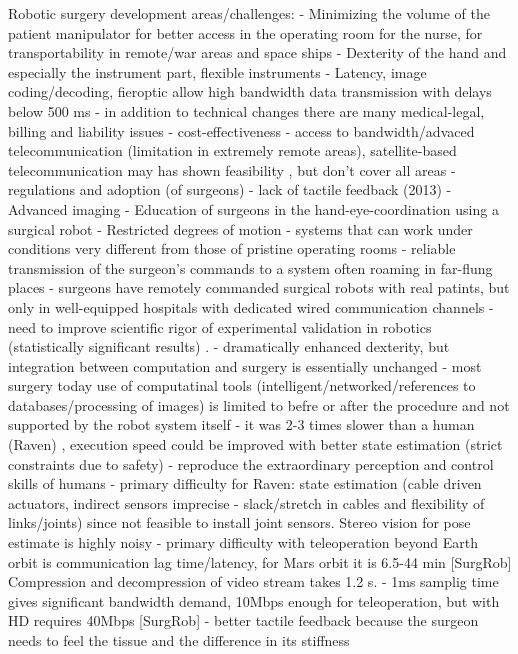 Robotic surgery development areas/challenges:
- Minimizing the volume of the patient manipulator for better access in the operating room for the nurse, for transportability in remote/war areas and space ships
- Dexterity of the hand and especially the instrument part, flexible instruments
- Latency, image coding/decoding, fieroptic allow high bandwidth data transmission with delays below 500 ms
- in addition to technical changes there are many medical-legal, billing and liability issues
- cost-effectiveness
- access to bandwidth/advaced telecommunication (limitation in extremely remote areas), satellite-based telecommunication may has shown feasibility \citep{bib:telesurg_history}, but don't cover all areas \citep{bib:docatadist}
- regulations and adoption (of surgeons)
- lack of tactile feedback (2013)
- Advanced imaging
- Education of surgeons in the hand-eye-coordination using a surgical robot
- Restricted degrees of motion
- systems that can work under conditions very different from those of pristine operating rooms \citep{bib:docatadist}
- reliable transmission of the surgeon's commands to a system often roaming in far-flung places
- surgeons have remotely commanded surgical robots with real patints, but only in well-equipped hospitals with dedicated wired communication channels
- need to improve scientific rigor of experimental validation in robotics (statistically significant results) \citep{bib:raven_ii}.
- dramatically enhanced dexterity, but integration between computation and surgery is essentially unchanged \citep{bib:raven_ii}
- most surgery today use of computatinal tools (intelligent/networked/references to databases/processing of images) is limited to befre or after the procedure and not supported by the robot system itself \citep{bib:raven_ii}
- it was 2-3 times slower than a human (Raven) \citep{bib:raven_debride}, execution speed could be improved with better state estimation (strict constraints due to safety)
- reproduce the extraordinary perception and control skills of humans \citep{bib:raven_debride}
- primary difficulty for Raven: state estimation (cable driven actuators, indirect sensors imprecise - slack/stretch in cables and flexibility of links/joints) since not feasible to install joint sensors. Stereo vision for pose estimate is highly noisy \citep{bib:raven_debride}
- primary difficulty with teleoperation beyond Earth orbit is communication lag time/latency, for Mars orbit it is 6.5-44 min [SurgRob] Compression and decompression of video stream takes 1.2 s.
- 1ms samplig time gives significant bandwidth demand, 10Mbps enough for teleoperation, but with HD requires 40Mbps [SurgRob]
- better tactile feedback because the surgeon needs to feel the tissue and the difference in its stiffness



